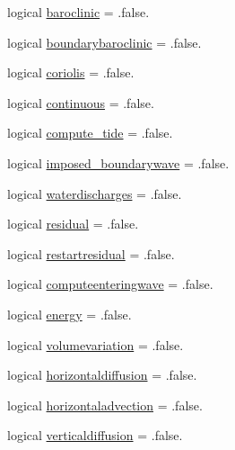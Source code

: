 \begin{DoxyCompactItemize}
\item 
logical \mbox{\hyperlink{structmodulehydrodynamic_1_1t__hydrooptions_a0c7ddbfbc288a108411f6e3cfe6417dc}{baroclinic}} = .false.
\item 
logical \mbox{\hyperlink{structmodulehydrodynamic_1_1t__hydrooptions_a0a56226b31c5cc582d47db4b8df433c8}{boundarybaroclinic}} = .false.
\item 
logical \mbox{\hyperlink{structmodulehydrodynamic_1_1t__hydrooptions_a0c6f24812d7d5f587615862327709af3}{coriolis}} = .false.
\item 
logical \mbox{\hyperlink{structmodulehydrodynamic_1_1t__hydrooptions_a7d4b84b631d5d11a5f34f4d814faf9d1}{continuous}} = .false.
\item 
logical \mbox{\hyperlink{structmodulehydrodynamic_1_1t__hydrooptions_a107380ecea2747b89025608fa1ac103b}{compute\+\_\+tide}} = .false.
\item 
logical \mbox{\hyperlink{structmodulehydrodynamic_1_1t__hydrooptions_a99153194cc600f1dc086abaf189c6bb4}{imposed\+\_\+boundarywave}} = .false.
\item 
logical \mbox{\hyperlink{structmodulehydrodynamic_1_1t__hydrooptions_aab568cda83a7f47978674d838b2bfe78}{waterdischarges}} = .false.
\item 
logical \mbox{\hyperlink{structmodulehydrodynamic_1_1t__hydrooptions_ac9d30d45db80fbf68c14deb424fd8a24}{residual}} = .false.
\item 
logical \mbox{\hyperlink{structmodulehydrodynamic_1_1t__hydrooptions_a6a34c3c3cd897487dd784a8eb3d2f4d6}{restartresidual}} = .false.
\item 
logical \mbox{\hyperlink{structmodulehydrodynamic_1_1t__hydrooptions_afc88528393bd9eb7a6bd6d666429d3fd}{computeenteringwave}} = .false.
\item 
logical \mbox{\hyperlink{structmodulehydrodynamic_1_1t__hydrooptions_a82e5aab9b8659f776747228e03c627e8}{energy}} = .false.
\item 
logical \mbox{\hyperlink{structmodulehydrodynamic_1_1t__hydrooptions_abafeaae204c46a11e3e9af8f4c7b679e}{volumevariation}} = .false.
\item 
logical \mbox{\hyperlink{structmodulehydrodynamic_1_1t__hydrooptions_a2ef939034cb3396dc1e464e0ed8b48f1}{horizontaldiffusion}} = .false.
\item 
logical \mbox{\hyperlink{structmodulehydrodynamic_1_1t__hydrooptions_a3f75c7dd273d6fa8101fb618bb9e7111}{horizontaladvection}} = .false.
\item 
logical \mbox{\hyperlink{structmodulehydrodynamic_1_1t__hydrooptions_aaf41325bb1b7386e688549da436524f8}{verticaldiffusion}} = .false.

\end{DoxyCompactItemize}
